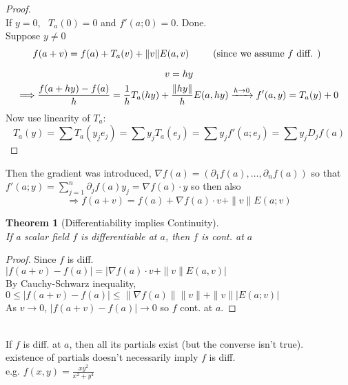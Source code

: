 \documentclass[twoside]{amsart}
\theoremstyle{plain}
\newtheorem{theorem}{Theorem}
\theoremstyle{definition}
\begin{document}
\begin{proof} \quad \\
  If $y=0$, \quad \, $T_a(0) = 0$ and $f'(a;0)=0$.  Done.  \bigskip \\
  Suppose $y\neq 0$ \\
  \[
\begin{gathered}
  f(a+v) = f(a) +T_a(v) + \| v \| E(a,v) \quad \quad \, \text{ (since we assume $f$ diff. ) } \medskip \\
  v = hy \\
\Longrightarrow \frac{ f(a+hy) - f(a) }{ h } = \frac{1}{h} T_a(hy) + \frac{ \| hy \| }{ h } E(a,hy) \xrightarrow{ h\to 0 } f'(a,y)  = T_a(y)  + 0 \\
\end{gathered}
\]
Now use linearity of $T_a$: \[ T_a(y) = \sum T_a (y_j e_j) = \sum y_j T_a(e_j) = \sum y_j f'(a;e_j) = \sum y_j D_j f(a) \]
\end{proof}

Then the gradient was introduced, $\nabla f(a) = (\partial_1 f(a), \dots, \partial_n f(a) )$ so that \\
$f'(a;y) = \sum_{j=1}^n \partial_j f(a) y_j =\nabla f(a) \cdot y $  so then also
\[
\Longrightarrow f(a+v) = f(a) + \nabla f(a) \cdot v + \| v \| E(a;v)
\]

\begin{theorem}[Differentiability implies Continuity] \quad \\
If a scalar field $f$ is differentiable at $a$, then $f$ is cont. at $a$
\end{theorem}

\begin{proof}
  Since $f$ is diff. \\
$|f(a+v) -f(a)| = |\nabla f(a) \cdot v + \| v \| E(a,v) | $\\
By Cauchy-Schwarz inequality, \medskip \\
$0\leq | f(a+v) -f(a) | \leq \| \nabla f(a) \| \| v \| + \| v \| |E(a;v) |$ \medskip \\
As $v\to 0$, $|f(a+v) - f(a)| \to 0$ so $f$ cont. at $a$.  
\end{proof}

\quad \bigskip \\
If $f$ is diff. at $a$, then all its partials exist (but the converse isn't true).  \\
\phantom{If} existence of partials doesn't necessarily imply $f$ is diff. \\
e.g. $f(x,y) = \frac{ xy^2}{ x^2 + y^4}$ \quad \bigskip \\
\end{document}
